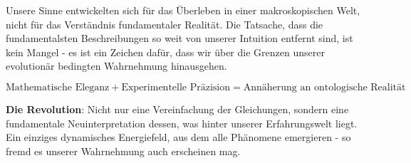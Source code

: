 \documentclass[12pt,a4paper]{article}
\begin{document}
	Unsere Sinne entwickelten sich für das Überleben in einer makroskopischen Welt, nicht für das Verständnis fundamentaler Realität. Die Tatsache, dass die fundamentalsten Beschreibungen so weit von unserer Intuition entfernt sind, ist kein Mangel - es ist ein Zeichen dafür, dass wir über die Grenzen unserer evolutionär bedingten Wahrnehmung hinausgehen.
	
	\begin{equation}
		\boxed{\text{Mathematische Eleganz} + \text{Experimentelle Präzision} = \text{Annäherung an ontologische Realität}}
	\end{equation}
	
	\textbf{Die Revolution}: Nicht nur eine Vereinfachung der Gleichungen, sondern eine fundamentale Neuinterpretation dessen, was hinter unserer Erfahrungswelt liegt. Ein einziges dynamisches Energiefeld, aus dem alle Phänomene emergieren - so fremd es unserer Wahrnehmung auch erscheinen mag.
	
\end{document}

